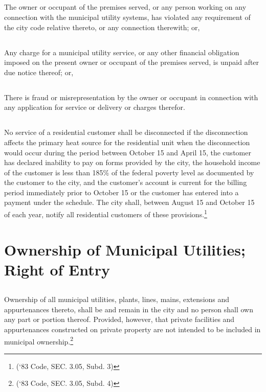 \subsection{}
The owner or occupant of the premises served, or any person working on any connection with the municipal utility systems, has violated any requirement of the city code relative thereto, or any connection therewith; or,
\subsection{}
Any charge for a municipal utility service, or any other financial obligation imposed on the present owner or occupant of the premises served, is unpaid after due notice thereof; or,
\subsection{}
There is fraud or misrepresentation by the owner or occupant in connection with any application for service or delivery or charges therefor.
\subsection{}
No service of a residential customer shall be disconnected if the disconnection affects the primary heat source for the residential unit when the disconnection would occur during the period between October 15 and April 15, the customer has declared inability to pay on forms provided by the city, the household income of the customer is less than 185\% of the federal poverty level as documented by the customer to the city, and the customer’s account is current for the billing period immediately prior to October 15 or the customer has entered into a payment under the schedule.  The city shall, between August 15 and October 15 of each year, notify all residential customers of these provisions.\footnote{(‘83 Code, SEC. 3.05, Subd. 3)}

\section{Ownership of Municipal Utilities; Right of Entry}
\subsection{}
Ownership of all municipal utilities, plants, lines, mains, extensions and appurtenances thereto, shall be and remain in the city and no person shall own any part or portion thereof.  Provided, however, that private facilities and appurtenances constructed on private property are not intended to be included in municipal ownership.\footnote{(‘83 Code, SEC. 3.05, Subd. 4)}
